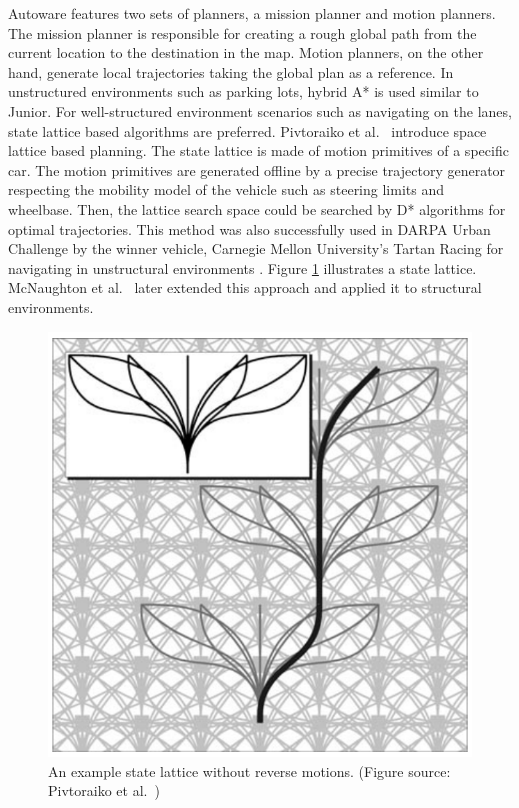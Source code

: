 Autoware features two sets of planners, a mission planner and motion planners.
The mission planner is responsible for creating a rough global path from the
current location to the destination in the map. Motion planners, on the other
hand, generate local trajectories taking the global plan as a reference. In
unstructured environments such as parking lots, hybrid A* is used similar to
Junior. For well-structured environment scenarios such as navigating on the
lanes, state lattice based algorithms are preferred. Pivtoraiko et al.\
\cite{Pivtoraiko2009DifferentiallyCM} introduce space lattice based planning.
The state lattice is made of motion primitives of a specific car. The motion
primitives are generated offline by a precise trajectory generator respecting
the mobility model of the vehicle such as steering limits and wheelbase. Then,
the lattice search space could be searched by D* algorithms for optimal
trajectories. This method was also successfully used in DARPA Urban Challenge
by the winner vehicle, Carnegie Mellon University's Tartan Racing for
navigating in unstructural environments \cite{Urmson2007TartanRA}. Figure
\ref{figure:state-lattice} illustrates a state lattice. McNaughton et al.\
\cite{McNaughton2011MotionPF} later extended this approach and applied it to
structural environments.

\begin{figure}[h]
  \centering
  \includegraphics[width=.8\textwidth]{figures/state-lattice.png}
  \caption[An example state lattice]{An example state lattice without reverse
    motions. (Figure source: Pivtoraiko et al.\
    \cite{Pivtoraiko2009DifferentiallyCM})}
  \label{figure:state-lattice}
\end{figure}


